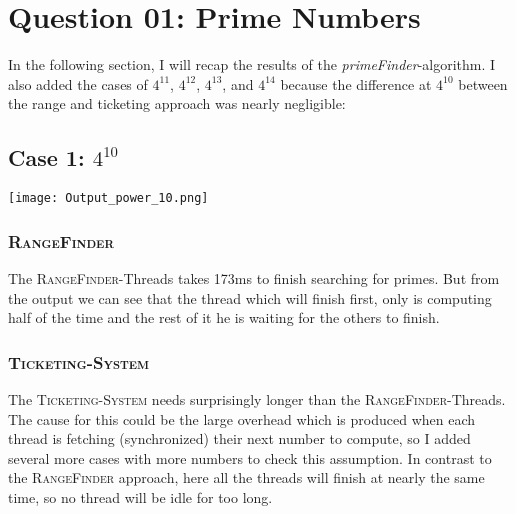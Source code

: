 \documentclass{article}
\begin{document}
	\pagestyle{fancy}
	
	\section*{Question 01: Prime Numbers}
	\begin{adjustwidth}{2em}{2em}
		In the following section, I will recap the results of the \textit{primeFinder}-algorithm. I also added the cases of $4^{11}$, $4^{12}$, $4^{13}$, and $4^14$ because the difference at $4^{10}$ between the range and ticketing approach was nearly negligible:
		\subsection*{Case 1: $4^{10}$}
		\begin{adjustwidth}{2em}{2em}
			\texttt{[image: Output\_power\_10.png]}
			\subsubsection*{\textsc{RangeFinder}}
			\begin{adjustwidth}{1em}{}
				The \textsc{RangeFinder}-Threads takes 173ms to finish searching for primes. But from the output we can see that the thread which will finish first, only is computing half of the time and the rest of it he is waiting for the others to finish.
			\end{adjustwidth}
			\subsubsection*{\textsc{Ticketing-System}}
			\begin{adjustwidth}{1em}{}
				The \textsc{Ticketing-System} needs surprisingly longer than the \textsc{RangeFinder}-Threads. The cause for this could be the large overhead which is produced when each thread is fetching (synchronized) their next number to compute, so I added several more cases with more numbers to check this assumption. In contrast to the \textsc{RangeFinder} approach, here all the threads will finish at nearly the same time, so no thread will be idle for too long.
			\end{adjustwidth}

\end{adjustwidth}
\end{adjustwidth}
\end{document}
